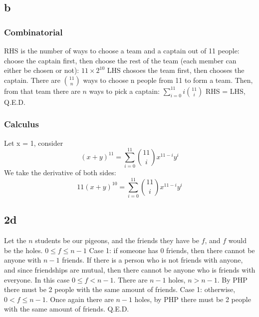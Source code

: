 \documentclass[12pt]{article}
\begin{document}
\subsection{b}
\subsubsection{Combinatorial}
RHS is the number of ways to choose a team and a captain out of 11 people: choose the captain first, then choose the rest of the team (each member can either be chosen or not): $11 \times 2^{10}$
\newline
LHS chosoes the team first, then chooses the captain. There are $\binom{11}{n}$ ways to choose n people from 11 to form a team. Then, from that team there are $n$ ways to pick a captain: $\sum_{i=0}^{11}i\binom{11}{i}$
\newline
RHS = LHS, Q.E.D.

\subsubsection{Calculus}
Let x = 1, consider $$(x+y)^{11} = \sum_{i=0}^{11}\binom{11}{i}x^{11-i}y^i$$
We take the derivative of both sides:
$$11(x+y)^{10} = \sum_{i=0}^{11}\binom{11}{i}x^{11-i}y^i$$


\subsection{2d}
Let the $n$ students be our pigeons, and the friends they have be $f$, and $f$ would be the holes. $0 \leq f \leq n-1$
\newline
Case 1: if someone has $0$ friends, then there cannot be anyone with $n-1$ friends. If there is a person who is not friends with anyone, and since friendships are mutual, then there cannot be anyone who is friends with everyone. In this case $0 \leq f < n-1$. There are $n-1$ holes, $n > n-1$. By PHP there must be 2 people with the same amount of friends.
\newline
Case 1: otherwise, $0 < f \leq n-1$. Once again there are $n-1$ holes, by PHP there must be 2 people with the same amount of friends.
\newline
Q.E.D.
\end{document}
